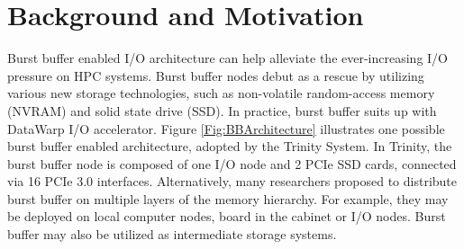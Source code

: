 \section{Background and Motivation}
\label{Sec:Background}

Burst buffer enabled I/O architecture can help alleviate
the ever-increasing I/O pressure on HPC systems.
Burst buffer nodes debut as a rescue by utilizing various new storage technologies,
such as non-volatile random-access memory (NVRAM) and solid state drive (SSD).
In practice, burst buffer suits up with DataWarp I/O accelerator\cite{DataWarp}.
Figure \ref{Fig:BBArchitecture} illustrates one possible burst buffer enabled architecture,
adopted by the Trinity System\cite{TrinitySystem}.
In Trinity, the burst buffer node is composed of one I/O node and 2 PCIe SSD cards,
connected via 16 PCIe 3.0 interfaces.
Alternatively, many researchers proposed to distribute burst buffer 
on multiple layers of the memory hierarchy\cite{Romanus:CORR:15}.
For example, they may be deployed on local computer nodes, board in the cabinet or I/O nodes.
Burst buffer may also be utilized as intermediate storage systems.

